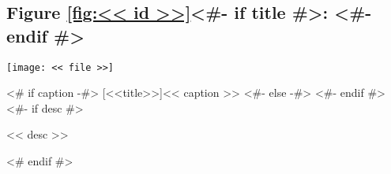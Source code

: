\subsection{Figure \ref{fig:<< id >>}<#- if title #>: <#- endif #>\hfill%
  \color{light-gray}}
\noindent\centerline{\texttt{[image: << file >>]}}
<# if caption -#>
[<<title>>]{<< caption >>}
<#- else -#>
<#- endif #>\label{fig:<< id >>}
<#- if desc #>
\nopagebreak
\begin{figinfo}<< desc >>\end{figinfo}
<# endif #>
\vspace{20pt}
